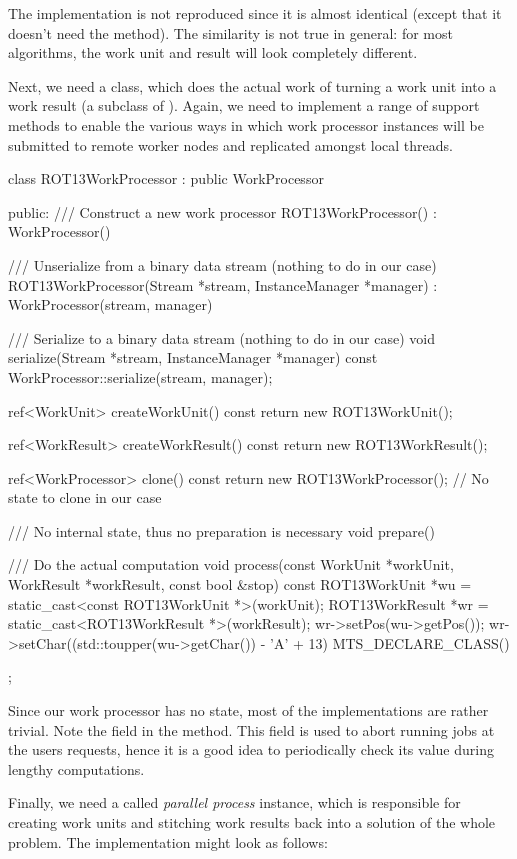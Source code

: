 The  implementation is not reproduced since it is almost identical 
(except that it doesn't need the  method).
The similarity is not true in general: for most algorithms, the work unit and result 
will look completely different.

Next, we need a class, which does the actual work of turning a work unit into a work result
(a subclass of ). Again, we need to implement a range of support
methods to enable the various ways in which work processor instances will be submitted to 
remote worker nodes and replicated amongst local threads.
\begin{cpp}
class ROT13WorkProcessor : public WorkProcessor {
public:
	/// Construct a new work processor
	ROT13WorkProcessor() : WorkProcessor() { }

	/// Unserialize from a binary data stream (nothing to do in our case)
	ROT13WorkProcessor(Stream *stream, InstanceManager *manager)
		: WorkProcessor(stream, manager) { }

	/// Serialize to a binary data stream (nothing to do in our case)
	void serialize(Stream *stream, InstanceManager *manager) const {
		WorkProcessor::serialize(stream, manager);
	}

	ref<WorkUnit> createWorkUnit() const {
		return new ROT13WorkUnit();
	}

	ref<WorkResult> createWorkResult() const { 
		return new ROT13WorkResult();
	}

	ref<WorkProcessor> clone() const {
		return new ROT13WorkProcessor(); // No state to clone in our case
	}

	/// No internal state, thus no preparation is necessary
	void prepare() { }

	/// Do the actual computation
	void process(const WorkUnit *workUnit, WorkResult *workResult, 
				 const bool &stop) {
		const ROT13WorkUnit *wu 
			= static_cast<const ROT13WorkUnit *>(workUnit);
		ROT13WorkResult *wr = static_cast<ROT13WorkResult *>(workResult);
		wr->setPos(wu->getPos());
		wr->setChar((std::toupper(wu->getChar()) - 'A' + 13) %
	}
	MTS_DECLARE_CLASS()
};
\end{cpp}
Since our work processor has no state, most of the implementations
are rather trivial. Note the  field in the 
method. This field is used to abort running jobs at the users requests, hence
it is a good idea to periodically check its value during lengthy computations.

Finally, we need a called \emph{parallel process}
instance, which is responsible for creating work units and stitching
work results back into a solution of the whole problem. The 
implementation might look as follows:
\begin{cpp}
\end{cpp}

